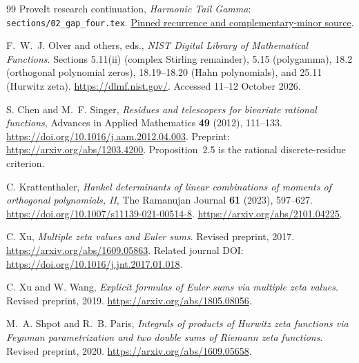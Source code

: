 \begin{thebibliography}{99}
ProveIt research continuation,
\emph{Harmonic Tail Gamma}:
\texttt{sections/02\_gap\_four.tex}.
\href{https://github.com/VladimirReshetnikov/ProveIt/blob/c4036d60715916ae72dd18983782fdb182840b86/Analysis/Polylogarithms/docs/reports/stieltjes-harmonic-resonance/continuations/harmonic-tail-gamma/sections/02_gap_four.tex}{Pinned recurrence and complementary-minor source}.

F.~W.~J. Olver and others, eds.,
\emph{NIST Digital Library of Mathematical Functions}.
Sections 5.11(ii) (complex Stirling remainder), 5.15 (polygamma),
18.2 (orthogonal polynomial zeros), 18.19--18.20 (Hahn
polynomials), and 25.11 (Hurwitz zeta).
\url{https://dlmf.nist.gov/}.
Accessed 11--12 October 2026.

S. Chen and M.~F. Singer,
\emph{Residues and telescopers for bivariate rational functions},
Advances in Applied Mathematics \textbf{49} (2012), 111--133.
\url{https://doi.org/10.1016/j.aam.2012.04.003}.
Preprint: \url{https://arxiv.org/abs/1203.4200}.
Proposition~2.5 is the rational discrete-residue criterion.

C. Krattenthaler,
\emph{Hankel determinants of linear combinations of moments of
orthogonal polynomials, II},
The Ramanujan Journal \textbf{61} (2023), 597--627.
\url{https://doi.org/10.1007/s11139-021-00514-8}.
\url{https://arxiv.org/abs/2101.04225}.

C. Xu, \emph{Multiple zeta values and Euler sums}.
Revised preprint, 2017.
\url{https://arxiv.org/abs/1609.05863}.
Related journal DOI: \url{https://doi.org/10.1016/j.jnt.2017.01.018}.

C. Xu and W. Wang,
\emph{Explicit formulas of Euler sums via multiple zeta values}.
Revised preprint, 2019.
\url{https://arxiv.org/abs/1805.08056}.

M.~A. Shpot and R.~B. Paris,
\emph{Integrals of products of Hurwitz zeta functions via Feynman
parametrization and two double sums of Riemann zeta functions}.
Revised preprint, 2020.
\url{https://arxiv.org/abs/1609.05658}.

\end{thebibliography}
